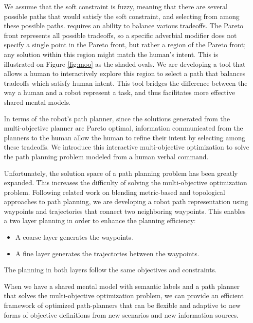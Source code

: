 We assume that the soft constraint is fuzzy, meaning that there are several possible paths that would satisfy the soft constraint, and selecting from among these possible paths. requires an ability to balance various tradeoffs.
The Pareto front represents all possible tradeoffs, so a specific adverbial modifier does not specify a single point in the Pareto front, but rather a region of the Pareto front; any solution within this region might match the human's intent.
This is illustrated on Figure \ref{fig:moo} as  the shaded ovals.
We are developing a tool that allows a human to interactively explore this region to select a path that balances tradeoffs which satisfy human intent.
This tool bridges the difference between the way a human and a robot represent a task, and thus facilitates more effective shared mental models.
 

In terms of the robot's path planner, since the solutions generated from the multi-objective planner are Pareto optimal, information communicated from the planners to the human allow the human to refine their intent by selecting among these tradeoffs.
We introduce this interactive multi-objective optimization to solve the path planning problem modeled from a human verbal command.

Unfortunately, the solution space of a path planning problem has been greatly expanded.
This increases the difficulty of solving the multi-objective optimization problem.
Following related work on blending metric-based and topological approaches to path planning, we are developing a robot path representation using waypoints and trajectories that connect two neighboring waypoints.
This enables a two layer planning in order to enhance the planning efficiency:
\begin{itemize}
\item A coarse layer generates the waypoints.
\item A fine layer generates the trajectories between the waypoints.
\end{itemize}
The planning in both layers follow the same objectives and constraints.

When we have a shared mental model with semantic labels and a path planner that solves the multi-objective optimization problem, we can provide an efficient framework of optimized path-planners that can be flexible and adaptive to new forms of objective definitions from new scenarios and new information sources.
